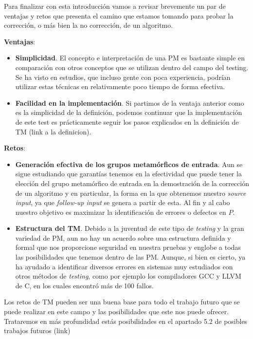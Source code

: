 Para finalizar con esta introducción vamos a revisar brevemente un par de ventajas y retos que presenta el camino que estamos tomando para probar la corrección, o más bien la no corrección, de un algoritmo. \newline

\textbf{Ventajas}:
\begin{itemize}
    \item \textbf{Simplicidad}. El concepto e interpretación de una PM es bastante simple en comparación con otros conceptos que se utilizan dentro del campo del testing. Se ha visto en estudios, que incluso gente con poca experiencia, podrían utilizar estas técnicas en relativamente poco tiempo de forma efectiva.\cite{Note:MT55} \cite{Note:MT73}
    \item \textbf{Facilidad en la implementación}. Si partimos de la ventaja anterior como es la simplicidad de la definición, podemos continuar que la implementación de este test es prácticamente seguir los pasos explicados en la definición de TM (link a la definicion).
\end{itemize}

\vspace{10pt}

\textbf{Retos}:
\begin{itemize}
    \item \textbf{Generación efectiva de los grupos metamórficos de entrada}. Aun se sigue estudiando que garantías tenemos en la efectividad que puede tener la elección del grupo metamórfico de entrada en la demostración de la corrección de un algoritmo y en particular, la forma en la que obtenemos nuestro \textit{source input}, ya que \textit{follow-up input} se genera a partir de esta. Al fin y al cabo nuestro objetivo es maximizar la identificación de errores o defectos en $P$.
    
    \item \textbf{Estructura del TM}. Debido a la juventud de este tipo de \textit{testing} y la gran variedad de PM, aun no hay un acuerdo sobre una estructura definida y formal que nos proporcione seguridad en nuestra pruebas y englobe a todas las posibilidades que tenemos dentro de las PM. Aunque, si bien es cierto, ya ha ayudado a identificar diversos errores en sistemas muy estudiados con otros métodos de \textit{testing}, como por ejemplo los compiladores GCC y LLVM de C, en los cuales encontró más de 100 fallos.\cite{Note:MT50} \cite{Note:MT51} \cite{Note:MT78}
\end{itemize}

Los retos de TM pueden ser una buena base para todo el trabajo futuro que se puede realizar en este campo y las posibilidades que este nos puede ofrecer. Trataremos en más profundidad estás posibilidades en el apartado 5.2 de posibles trabajos futuros (link)



